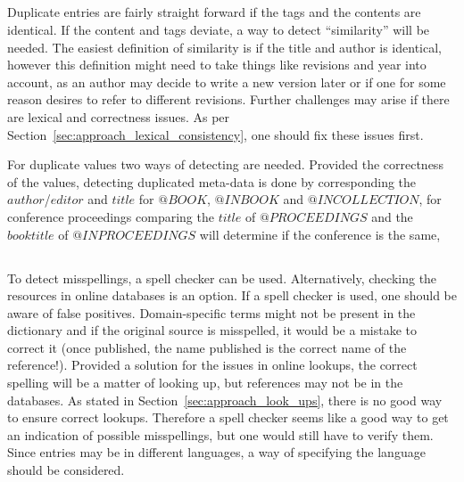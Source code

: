 \subsection{}
\label{sec:approach_duplicates}

Duplicate entries are fairly straight forward if the tags and the
contents are identical.  If the content and tags deviate, a way to
detect ``similarity'' will be needed.  The easiest definition of
similarity is if the title and author is identical, however this
definition might need to take things like revisions and year into
account, as an author may decide to write a new version later or if
one for some reason desires to refer to different revisions.  Further
challenges may arise if there are lexical and correctness issues.  As
per Section~\ref{sec:approach_lexical_consistency}, one should fix
these issues first.

For duplicate values two ways of detecting are needed.  Provided the
correctness of the values, detecting duplicated meta-data is done by
corresponding the $author$/$editor$ and $title$ for $@BOOK$, $@INBOOK$
and $@INCOLLECTION$, for conference proceedings comparing the $title$
of $@PROCEEDINGS$ and the $booktitle$ of $@INPROCEEDINGS$ will
determine if the conference is the same,


\subsection{}

To detect misspellings, a spell checker can be used.  Alternatively,
checking the resources in online databases is an option.  If a spell
checker is used, one should be aware of false positives.
Domain-specific terms might not be present in the dictionary and if
the original source is misspelled, it would be a mistake to correct it
(once published, the name published is the correct name of the
reference!).  Provided a solution for the issues in online lookups,
the correct spelling will be a matter of looking up, but references
may not be in the databases.  As stated in
Section~\ref{sec:approach_look_ups}, there is no good way to ensure
correct lookups.  Therefore a spell checker seems like a good way to
get an indication of possible misspellings, but one would still have
to verify them.  Since entries may be in different languages, a way of
specifying the language should be considered.


\subsection{}
\label{sec:approach_spelling_names}

